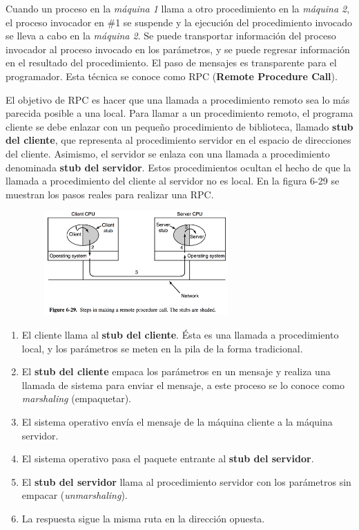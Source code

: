 \documentclass[10pt,a4paper]{report}
\begin{document}
	\par Cuando un proceso en la \textit{máquina 1} llama a otro procedimiento en la \textit{máquina 2}, el proceso invocador en \#1 se suspende y la ejecución del procedimiento invocado se lleva a cabo en la \textit{máquina 2}. Se puede transportar información del proceso invocador al proceso invocado en los parámetros, y se puede regresar información en el resultado del procedimiento. El paso de mensajes es transparente para el programador. Esta técnica se conoce como RPC (\textbf{Remote Procedure Call}).

	\par El objetivo de RPC es hacer que una llamada a procedimiento remoto sea lo más parecida posible a una local. Para llamar a un procedimiento remoto, el programa cliente se debe enlazar con un pequeño procedimiento de biblioteca, llamado \textbf{stub del cliente}, que representa al procedimiento servidor en el espacio de direcciones del cliente. Asimismo, el servidor se enlaza con una llamada a procedimiento denominada \textbf{stub del servidor}. Estos procedimientos ocultan el hecho de que la llamada a procedimiento del cliente al servidor no es local. En la figura 6-29 se muestran los pasos reales para realizar una RPC.
	
	\begin{center}
		\includegraphics[width=10cm, height=4cm]{./imagenes/rpc.png} 
	\end{center}
	
	\begin{enumerate}
		\item El cliente llama al \textbf{stub del cliente}. Ésta es una llamada a procedimiento local, y los parámetros se meten en la pila de la forma tradicional.
		\item El \textbf{stub del cliente} empaca los parámetros en un mensaje y realiza una llamada de sistema para enviar el mensaje, a este proceso se lo conoce como \textit{marshaling} (empaquetar).
		\item El sistema operativo envía el mensaje de la máquina cliente a la máquina servidor.
		\item El sistema operativo pasa el paquete entrante al \textbf{stub del servidor}. 
		\item El \textbf{stub del servidor} llama al procedimiento servidor con los parámetros sin empacar (\textit{unmarshaling}).
		\item La respuesta sigue la misma ruta en la dirección opuesta.
	\end{enumerate}
	
\end{document}
